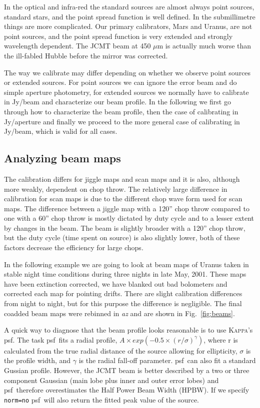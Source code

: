 \documentclass[twoside,11pt]{article}
\newcommand{\Kappa}{\xref{\textsc{Kappa}}{sun95}{}}
\newcommand{\task}[1]{\textsf{#1}}
\newcommand{\psf}{\xref{\task{psf}}{sun95}{PSF}}
\newcommand{\xref}[3]{#1}
\newcommand{\xlabel}[1]{}
\renewcommand{\_}{\texttt{\symbol{95}}}
\begin{document}
In the optical and infra-red the standard sources are almost always
point sources, standard stars, and the point spread function is well
defined.  In the submillimetre things are more complicated.  Our
primary calibrators, Mars and Uranus, are not point sources, and the
point spread function is very extended and strongly wavelength
dependent.  The JCMT beam at 450 $\mu$m is actually much worse than
the ill-fabled Hubble before the mirror was corrected.

The way we calibrate may differ depending on whether we observe point
sources or extended sources.  For point sources we can ignore the
error beam and do simple aperture photometry, for extended sources we
normally have to calibrate in Jy/beam and characterize our beam
profile.  In the following we first go through how to characterize the
beam profile, then the case of calibrating in Jy/aperture and finally
we proceed to the more general case of calibrating in Jy/beam, which
is valid for all cases.


\subsection{\xlabel{beam_profiles} Analyzing beam maps 
\label{beam_profiles}}

The calibration differs for jiggle maps and scan maps and it is also,
although more weakly, dependent on chop throw.  The relatively large
difference in calibration for scan maps is due to the different chop
wave form used for scan maps.  The difference between a jiggle map
with a 120'' chop throw compared to one with a 60'' chop throw is
mostly dictated by duty cycle and to a lesser extent by changes in the
beam.  The beam is slightly broader with a 120'' chop throw, but the
duty cycle (time spent on source) is also slightly lower, both of
these factors decrease the efficiency for large chops.

  
In the following example we are going to look at beam maps of Uranus
taken in stable night time conditions during three nights in late May,
2001. These maps have been extinction corrected, we have blanked out
bad bolometers and corrected each map for pointing drifts. There are
slight calibration differences from night to night, but for this
purpose the difference is negligible. The final coadded beam maps were
rebinned in {\it az} and are shown in Fig.\ \ref{fig:beams}.

A quick way to diagnose that the beam profile looks reasonable is to
use \Kappa's \psf.  The task \psf\ fits a radial profile, $ A \times
exp(-0.5 \times (r/\sigma)^\gamma)$, where r is calculated from the
true radial distance of the source allowing for ellipticity, $\sigma$
is the profile width, and $\gamma$ is the radial fall-off parameter.
\psf\ can also fit a standard Gussian profile.  However, the JCMT beam
is better described by a two or three component Gaussian (main lobe
plus inner and outer error lobes) and \psf\ therefore overestimates the
Half Power Beam Width (HPBW). If we specify \texttt{norm=no} \psf\ will
also return the fitted peak value of the source.
\end{document}
